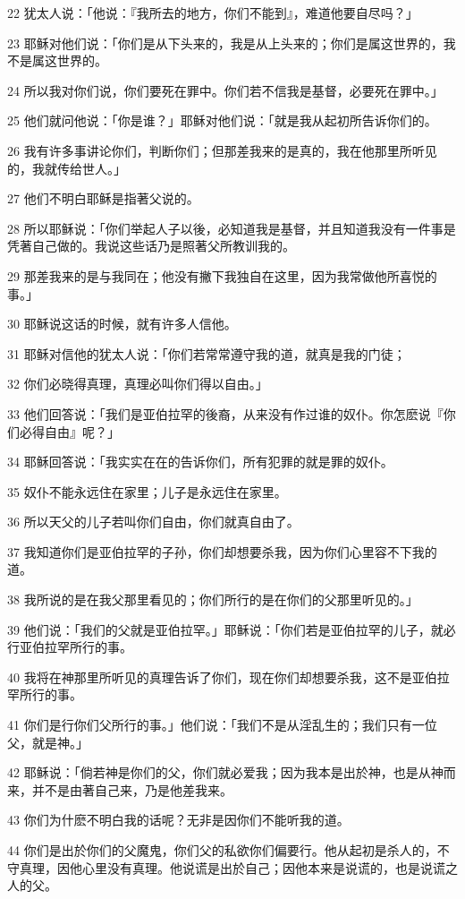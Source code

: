 \par 22 犹太人说：「他说：『我所去的地方，你们不能到』，难道他要自尽吗？」
\par 23 耶稣对他们说：「你们是从下头来的，我是从上头来的；你们是属这世界的，我不是属这世界的。
\par 24 所以我对你们说，你们要死在罪中。你们若不信我是基督，必要死在罪中。」
\par 25 他们就问他说：「你是谁？」耶稣对他们说：「就是我从起初所告诉你们的。
\par 26 我有许多事讲论你们，判断你们；但那差我来的是真的，我在他那里所听见的，我就传给世人。」
\par 27 他们不明白耶稣是指著父说的。
\par 28 所以耶稣说：「你们举起人子以後，必知道我是基督，并且知道我没有一件事是凭著自己做的。我说这些话乃是照著父所教训我的。
\par 29 那差我来的是与我同在；他没有撇下我独自在这里，因为我常做他所喜悦的事。」
\par 30 耶稣说这话的时候，就有许多人信他。
\par 31 耶稣对信他的犹太人说：「你们若常常遵守我的道，就真是我的门徒；
\par 32 你们必晓得真理，真理必叫你们得以自由。」
\par 33 他们回答说：「我们是亚伯拉罕的後裔，从来没有作过谁的奴仆。你怎麽说『你们必得自由』呢？」
\par 34 耶稣回答说：「我实实在在的告诉你们，所有犯罪的就是罪的奴仆。
\par 35 奴仆不能永远住在家里；儿子是永远住在家里。
\par 36 所以天父的儿子若叫你们自由，你们就真自由了。
\par 37 我知道你们是亚伯拉罕的子孙，你们却想要杀我，因为你们心里容不下我的道。
\par 38 我所说的是在我父那里看见的；你们所行的是在你们的父那里听见的。」
\par 39 他们说：「我们的父就是亚伯拉罕。」耶稣说：「你们若是亚伯拉罕的儿子，就必行亚伯拉罕所行的事。
\par 40 我将在神那里所听见的真理告诉了你们，现在你们却想要杀我，这不是亚伯拉罕所行的事。
\par 41 你们是行你们父所行的事。」他们说：「我们不是从淫乱生的；我们只有一位父，就是神。」
\par 42 耶稣说：「倘若神是你们的父，你们就必爱我；因为我本是出於神，也是从神而来，并不是由著自己来，乃是他差我来。
\par 43 你们为什麽不明白我的话呢？无非是因你们不能听我的道。
\par 44 你们是出於你们的父魔鬼，你们父的私欲你们偏要行。他从起初是杀人的，不守真理，因他心里没有真理。他说谎是出於自己；因他本来是说谎的，也是说谎之人的父。
